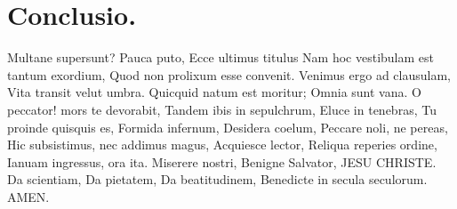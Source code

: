 \documentclass[12pt, twocolumn]{memoir}
\begin{document}
\chapter{Conclusio.}

Multane supersunt?
Pauca puto,
Ecce ultimus titulus 
Nam hoc vestibulam est tantum exordium,
Quod non prolixum esse convenit.
Venimus ergo ad clausulam,
Vita transit velut umbra.
Quicquid natum est moritur;
Omnia sunt vana.
O peccator! mors te devorabit,
Tandem ibis in sepulchrum,
Eluce in tenebras,
Tu proinde quisquis es,
Formida infernum,
Desidera coelum,
Peccare noli, ne pereas,
Hic subsistimus, nec addimus magus,
Acquiesce lector,
Reliqua reperies ordine,
Ianuam ingressus, ora ita.
Miserere nostri,
Benigne Salvator,
JESU CHRISTE.
Da scientiam,
Da pietatem,
Da beatitudinem,
Benedicte in secula seculorum.
AMEN.
\end{document}
